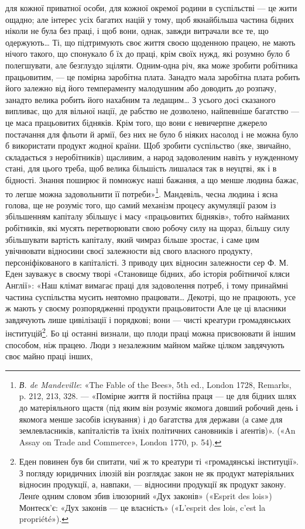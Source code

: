 \parcont{}  %
для кожної приватної особи, для кожної окремої родини в суспільстві
— це жити ощадно; але інтерес усіх багатих націй у
тому, щоб якнайбільша частина бідних ніколи не була без праці,
і щоб вони, однак, завжди витрачали все те, що одержують\dots{}
Ті, що підтримують своє життя своєю щоденною працею, не
мають нічого такого, що спонукало б їх до праці, крім своїх
нужд, які розумно було б полегшувати, але безглуздо зціляти.
Одним-одна річ, яка може зробити робітника працьовитим, —
це помірна заробітна плата. Занадто мала заробітна плата робить
його залежно від його темпераменту малодушним або доводить
до розпачу, занадто велика робить його нахабним та ледащим\dots{}
З усього досі сказаного випливає, що для вільної нації, де рабство
не дозволено, найпевніше багатство — це маса працьовитих бідняків.
Крім того, що вони є невичерпне джерело постачання для
фльоти й армії, без них не було б ніяких насолод і не можна
було б використати продукт жодної країни. Щоб зробити суспільство
(яке, звичайно, складається з неробітників) щасливим, а
народ задоволеним навіть у нужденному стані, для цього треба,
щоб велика більшість лишалася так в неуцтві, як і в бідності.
Знання поширює й помножує наші бажання, а що менше людина
бажає, то легше можна задовольнити її потреби»\footnote{
\emph{В. de Mandeville}: «The Fable of the Bees», 5th ed., London 1728,
Remarks, p. 212, 213, 328. — «Помірне життя й постійна праця — це для
бідних шлях до матеріяльного щастя (під яким він розуміє якомога довший
робочий день і якомога менше засобів існування) і до багатства для
держави (а саме для землевласників, капіталістів та їхніх політичних
сановників і аґентів)». («An Assay on Trade and Commerce», London
1770, p. 54).
}. Мандевіль,
чесна людина і ясна голова, ще не розуміє того, що самий механізм
процесу акумуляції разом із збільшенням капіталу збільшує
і масу «працьовитих бідняків», тобто найманих робітників,
які мусять перетворювати свою робочу силу на щораз, більшу
силу збільшувати вартість капіталу, який чимраз більше зростає,
і саме цим увічнювати відносини своєї залежности від
свого власного продукту, персоніфікованого в капіталісті. З приводу
цих відносин залежности сер Ф. М. Еден зауважує в своєму
творі «Становище бідних, або історія робітничої кляси Англії»:
«Наш клімат вимагає праці для задоволення потреб, і тому
принаймні частина суспільства мусить невтомно працювати\dots{}
Декотрі, що не працюють, усе ж мають у своєму розпорядженні
продукти працьовитости Але це ці власники завдячують лише
цивілізації і порядкові; вони — чисті креатури громадянських
інституцій\footnote{
Еден повинен був би спитати, чиї ж то креатури ті «громадянські
інституції». З погляду юридичних ілюзій він розглядає закон не як
продукт матеріяльних відносин продукції, а, навпаки, — відносини продукції
як продукт закону. Ленґе одним словом збив ілюзорний «Дух
законів» («Esprit des lois») Монтеск’є: «Дух законів — це власність»
(«L’esprit des lois, c’est la propriété»).
}. Бо ці останні визнали, що плоди праці можна
присвоювати й іншим способом, ніж працею. Люди з незалежним
майном майже цілком завдячують своє майно праці інших,
\parbreak{}  %
